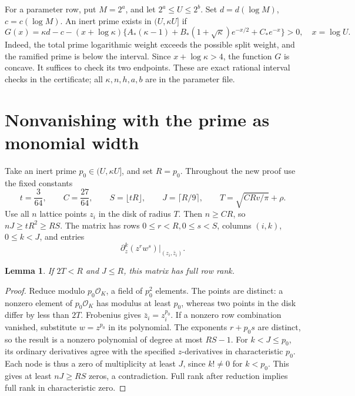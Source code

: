 \documentclass[11pt]{article}
\newtheorem{lemma}[theorem]{Lemma}
\newcommand{\OK}{\mathcal O_K}
\begin{document}
For a parameter row, put \(M=2^a\), and let
\(2^a\le U\le2^b\). Set \(d=d(\log M)\), \(c=c(\log M)\).
An inert prime exists in \((U,\kappa U]\) if
\begin{equation}\label{sieve-margin}
 G(x)=\kappa d-c-(x+\log\kappa)
 \{A_*(\kappa-1)+B_*(1+\sqrt\kappa)e^{-x/2}+C_*e^{-x}\}>0,
 \quad x=\log U.
\end{equation}
Indeed, the total prime logarithmic weight exceeds the possible split
weight, and the ramified prime is below the interval. Since
\(x+\log\kappa>4\), the function \(G\) is concave. It suffices to
check its two endpoints. These are exact rational interval checks in
the certificate; all \(\kappa,n,h,a,b\) are in the parameter file.

\section{Nonvanishing with the prime as monomial width}\label{rank}
Take an inert prime \(p_0\in(U,\kappa U]\), and set \(R=p_0\).
Throughout the new proof use the fixed constants
\begin{equation}\label{fixed}
 t=\frac3{64},\qquad C=\frac{27}{64},\qquad
 S=\lfloor tR\rfloor,\qquad J=\lceil R/9\rceil,
 \qquad T=\sqrt{CRv/\pi}+\rho.
\end{equation}
Use all \(n\) lattice points \(z_i\) in the disk of radius \(T\).
Then \(n\ge CR\), so \(nJ\ge tR^2\ge RS\).
The matrix has rows \(0\le r<R,0\le s<S\), columns \((i,k)\),
\(0\le k<J\), and entries
\[
 \partial_z^k(z^r w^s)\big|_{(z_i,\bar z_i)}.
\]

\begin{lemma}\label{nonzero}
If \(2T<R\) and \(J\le R\), this matrix has full row rank.
\end{lemma}
\begin{proof}
Reduce modulo \(p_0\OK\), a field of \(p_0^2\) elements. The points
are distinct: a nonzero element of \(p_0\OK\) has modulus at least
\(p_0\), whereas two points in the disk differ by less than \(2T\).
Frobenius gives \(\bar z_i=z_i^{p_0}\).
If a nonzero row combination vanished, substitute \(w=z^{p_0}\) in
its polynomial. The exponents \(r+p_0s\) are distinct, so the result
is a nonzero polynomial of degree at most \(RS-1\). For \(k<J\le p_0\),
its ordinary derivatives agree with the specified \(z\)-derivatives
in characteristic \(p_0\). Each node is thus a zero of multiplicity
at least \(J\), since \(k!\ne0\) for \(k<p_0\). This gives at least
\(nJ\ge RS\) zeros, a contradiction. Full rank after reduction
implies full rank in characteristic zero.
\end{proof}
\end{document}
